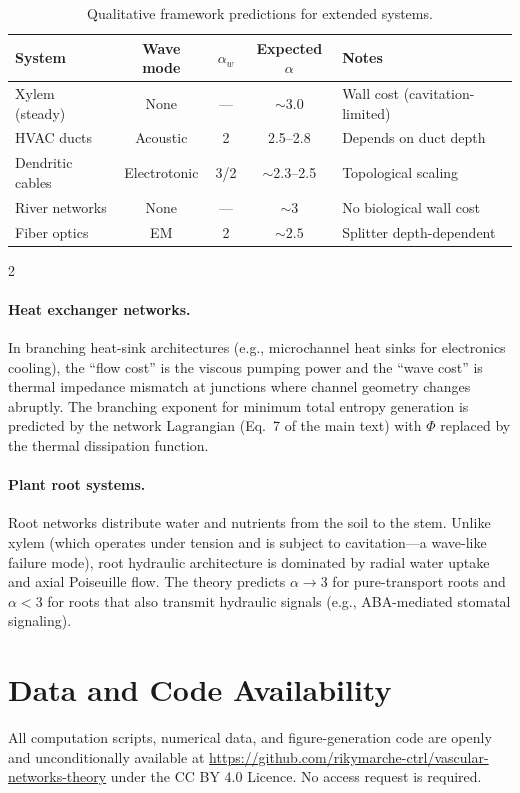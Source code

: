 \documentclass[11pt,a4paper]{article}
\begin{document}
\begin{table}[t]
\caption{Qualitative framework predictions for extended systems.}
\label{tab:extended}
\centering
\small
\begin{tabular}{@{}lcccp{5cm}@{}}
\toprule
System & Wave mode & $\alpha_w$ & Expected $\alpha$ & Notes \\
\midrule
Xylem (steady) & None & --- & $\sim 3.0$ & Wall cost (cavitation-limited) \\
HVAC ducts & Acoustic & 2 & 2.5--2.8 & Depends on duct depth \\
Dendritic cables & Electrotonic & 3/2 & $\sim$2.3--2.5 & Topological scaling \\
River networks & None & --- & $\sim 3$ & No biological wall cost \\
Fiber optics & EM & 2 & $\sim 2.5$ & Splitter depth-dependent \\
\bottomrule
\end{tabular}
\end{table}

\begin{multicols}{2}
\paragraph{Heat exchanger networks.}
In branching heat-sink architectures (e.g., microchannel heat sinks for
electronics cooling), the ``flow cost'' is the viscous pumping power and the
``wave cost'' is thermal impedance mismatch at junctions where channel geometry
changes abruptly. The branching exponent for minimum total entropy generation is
predicted by the network Lagrangian (Eq.~7 of the main text) with $\Phi$
replaced by the thermal dissipation function.

\paragraph{Plant root systems.}
Root networks distribute water and nutrients from the soil to the stem. Unlike
xylem (which operates under tension and is subject to cavitation---a wave-like
failure mode), root hydraulic architecture is dominated by radial water uptake
and axial Poiseuille flow. The theory predicts $\alpha \to 3$ for pure-transport
roots and $\alpha < 3$ for roots that also transmit hydraulic signals (e.g.,
ABA-mediated stomatal signaling).

\section{Data and Code Availability}
\label{sec:data}

All computation scripts, numerical data, and figure-generation code are openly
and unconditionally available at
\url{https://github.com/rikymarche-ctrl/vascular-networks-theory} under the CC BY 4.0
Licence. No access request is required.

\end{multicols}
\end{document}
